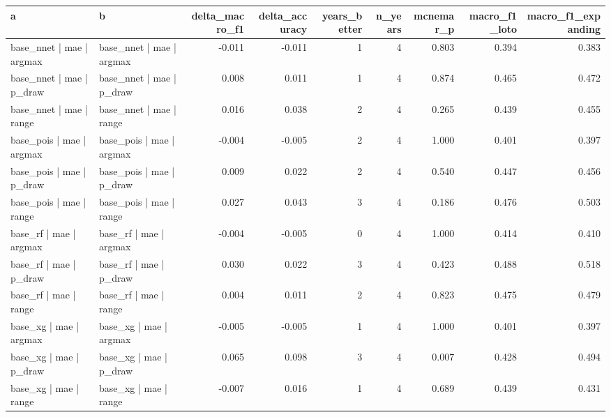 
\begin{tabular}{llrrrrrrr}
\toprule
a & b & delta\_macro\_f1 & delta\_accuracy & years\_better & n\_years & mcnemar\_p & macro\_f1\_loto & macro\_f1\_expanding\\
\midrule
base\_nnet | mae | argmax & base\_nnet | mae | argmax & -0.011 & -0.011 & 1 & 4 & 0.803 & 0.394 & 0.383\\
base\_nnet | mae | p\_draw & base\_nnet | mae | p\_draw & 0.008 & 0.011 & 1 & 4 & 0.874 & 0.465 & 0.472\\
base\_nnet | mae | range & base\_nnet | mae | range & 0.016 & 0.038 & 2 & 4 & 0.265 & 0.439 & 0.455\\
base\_pois | mae | argmax & base\_pois | mae | argmax & -0.004 & -0.005 & 2 & 4 & 1.000 & 0.401 & 0.397\\
base\_pois | mae | p\_draw & base\_pois | mae | p\_draw & 0.009 & 0.022 & 2 & 4 & 0.540 & 0.447 & 0.456\\
base\_pois | mae | range & base\_pois | mae | range & 0.027 & 0.043 & 3 & 4 & 0.186 & 0.476 & 0.503\\
base\_rf | mae | argmax & base\_rf | mae | argmax & -0.004 & -0.005 & 0 & 4 & 1.000 & 0.414 & 0.410\\
base\_rf | mae | p\_draw & base\_rf | mae | p\_draw & 0.030 & 0.022 & 3 & 4 & 0.423 & 0.488 & 0.518\\
base\_rf | mae | range & base\_rf | mae | range & 0.004 & 0.011 & 2 & 4 & 0.823 & 0.475 & 0.479\\
base\_xg | mae | argmax & base\_xg | mae | argmax & -0.005 & -0.005 & 1 & 4 & 1.000 & 0.401 & 0.397\\
base\_xg | mae | p\_draw & base\_xg | mae | p\_draw & 0.065 & 0.098 & 3 & 4 & 0.007 & 0.428 & 0.494\\
base\_xg | mae | range & base\_xg | mae | range & -0.007 & 0.016 & 1 & 4 & 0.689 & 0.439 & 0.431\\
\bottomrule
\end{tabular}
